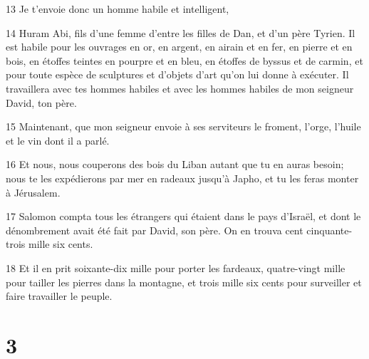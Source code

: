 \par 13 Je t'envoie donc un homme habile et intelligent,
\par 14 Huram Abi, fils d'une femme d'entre les filles de Dan, et d'un père Tyrien. Il est habile pour les ouvrages en or, en argent, en airain et en fer, en pierre et en bois, en étoffes teintes en pourpre et en bleu, en étoffes de byssus et de carmin, et pour toute espèce de sculptures et d'objets d'art qu'on lui donne à exécuter. Il travaillera avec tes hommes habiles et avec les hommes habiles de mon seigneur David, ton père.
\par 15 Maintenant, que mon seigneur envoie à ses serviteurs le froment, l'orge, l'huile et le vin dont il a parlé.
\par 16 Et nous, nous couperons des bois du Liban autant que tu en auras besoin; nous te les expédierons par mer en radeaux jusqu'à Japho, et tu les feras monter à Jérusalem.
\par 17 Salomon compta tous les étrangers qui étaient dans le pays d'Israël, et dont le dénombrement avait été fait par David, son père. On en trouva cent cinquante-trois mille six cents.
\par 18 Et il en prit soixante-dix mille pour porter les fardeaux, quatre-vingt mille pour tailler les pierres dans la montagne, et trois mille six cents pour surveiller et faire travailler le peuple.

\chapter{3}

